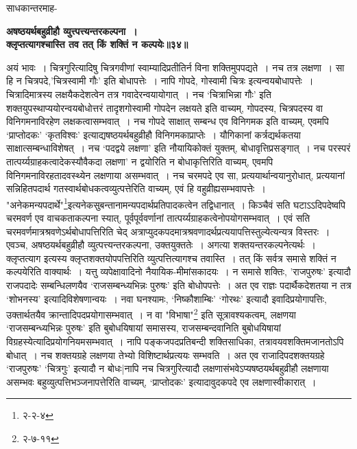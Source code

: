{{{{साधकान्तरमाह-
\begin{center}{\bfseries अषष्ठयर्थबहुव्रीहौ व्युत्त्पत्त्यन्तरकल्पना~।\\
 क्लृप्तत्यागश्चास्ति तव तत् किं शक्तिं न कल्पयेः॥३४॥}\end{center}
 
 अयं भावः~।
चित्रगुरित्यादिषु चित्रगवीणां स्वाम्यादिप्रतीतिर्न विना शक्तिमुपपद्यते~।
नच तत्र लक्षणा~।
सा हि न चित्रपदे,'चित्रस्वामी गौः' इति बोधापत्तेः~।
नापि गोपदे, गोस्वामी चित्रः इत्यन्वयबोधापत्तेः~।
चित्रादिमात्रस्य लक्षयैकदेशत्वेन तत्र गवादेरन्वयायोगात्~।
 नच `चित्राभिन्ना गौः' इति शक्तयुपस्थाप्ययोरन्वयबोधोत्तरं तादृशगोस्वामी गोपदेन लक्षयते इति वाच्यम्, गोपदस्य, चित्रपदस्य वा विनिगमनाविरहेण लक्षकत्वासम्भवात्~।
 नच गोपदे साक्षात् सम्बन्ध एव विनिगमक इति वाच्यम्, एवमपि `प्राप्तोदकः' `कृतविश्वः' इत्याद्यषष्ठयर्थबहुव्रीहौ विनिगमकाप्राप्तेः~।
यौगिकानां कर्त्रद्यर्थकतया साक्षात्सम्बन्धाविशेषत्~।
 नच `पदद्वये लक्षणा' इति नौयायिकोक्तं युक्तम्, बोधावृत्तिप्रसङ्गात्~।
नच परस्परं तात्पर्य्यग्राहकत्वादेकस्यौवैकदा लक्षणा' न द्वयोरिति न बोधाकृत्तिरिति वाच्यम्, एवमपि विनिगमनाविरहतादवस्थ्येन लक्षणाया असम्भवात्~।
 नच चरमपदे एव सा, प्रत्ययार्थान्वयानुरोधात्, प्रत्ययानां सन्निहितपदार्थ गतस्वार्थबोधकत्वव्युत्पत्तेरिति वाच्यम्, एवं हि वहुव्रीह्यसम्भवापत्तेः~।
"अनेकमन्यपदार्थे"\footnote{२-२-४}इत्यनेकसुबन्तानामन्यपदार्थप्रतिपादकत्वेन तद्विधानात्~।
 किञ्चैवं सति घटाऽऽदिपदेष्वपि चरमवर्ण एव वाचकताकल्पना स्यात्, पूर्वपूर्ववर्णानां तात्पर्य्यग्राहकत्वेनोपयोगसम्भवात्~।
एवं सति चरमवर्णमात्रश्रवणेऽर्थबोधापत्तिरिति चेद् अत्राप्युदकपदमात्रश्रवणादर्थप्रत्ययापत्तिस्तुल्येत्यन्यत्र विस्तरः~।
 एवञ्च, अषष्ठयर्थबहुव्रीहौ व्युत्पत्त्यन्तरकल्पना, उक्तयुक्ततेः~।
अगत्या शक्तयन्तरकल्पनेत्यर्थः~।
क्लृप्तत्याग इत्यस्य क्लृप्तशक्तयोपपत्तिरिति व्युत्पत्तित्यागश्च तवास्ति~।
तत् किं सर्वत्र समासे शक्तिं न कल्पयेरिति वाक्यार्थः~।
यत्तु व्यपेक्षावादिनो नैयायिक-मीमांसकादयः~।
न समासे शक्तिः, 'राजपुरुषः' इत्यादौ राजपदादेः सम्बन्धिलणयैव `राजसम्बन्ध्यभिन्नः पुरुषः' इति बोधोपपत्तेः~।
 अत एव राज्ञः पदार्थैकदेशतया न तत्र `शोभनस्य' इत्यादिविशेषणान्वयः~।
नवा घनश्यामः, `निष्कौशाम्बिः' `गोरथः' इत्यादौ इवादिप्रयोगापत्तिः, उक्तार्थतयैव क्रान्तादिपदप्रयोगासम्भवात्~।
न वा "विभाषा"\footnote{२-७-११} इति सूत्रावश्यकत्वम्, लक्षणया `राजसम्बन्ध्यभिन्नः पुरुषः' इति बुबोधयिषायां समासस्य, राजसम्बन्दवानिति बुबोधयिषायां विग्रहस्येत्यादिप्रयोगनियमसम्भवात्~।
नापि पङ्कजपदप्रतिबन्दी शक्तिसाधिका, तत्रावयवशक्तिमजानतोऽपि बोधात्~।
 नच शक्तयग्रहे लक्षणया तेभ्यो विशिष्टार्थप्रत्ययः सम्भवति~।
अत एव राजादिपदशक्तयग्रहे `राजपुरुषः' `चित्रगुः' इत्यादौ न बोधः|नापि {नच} चित्रगुरित्यादौ लक्षणासंभवेऽप्यषष्ठयर्थबहुव्रीहौ लक्षणाया असम्भवः बहुव्युत्पत्तिभञ्जनापत्तेरिति वाच्यम्, `प्राप्तोदकः' इत्यादावुदकपदे एव लक्षणास्वीकारात्~।
}}}}
